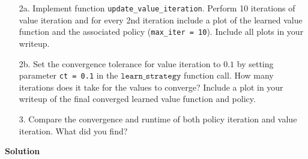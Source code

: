 \documentclass[submit]{harvardml}
\begin{document}
\begin{framed}
\begin{itemize}
    \item [2a.] Implement function
      \texttt{update\_value\_iteration}. Perform 10 iterations of
      value iteration and for every 2nd iteration include a plot of
      the learned value function and the associated policy
      (\texttt{max\_iter = 10}).  Include all plots in your writeup. 

    \item [2b.] Set the convergence tolerance for value iteration to
      $0.1$ by setting parameter \texttt{ct = 0.1} in the
      $\texttt{learn\_strategy}$ function call.  How many iterations
      does it take for the values to converge? Include a plot in your writeup of the final converged learned value function and policy.

      
\item[3.]  Compare the convergence and runtime of both policy iteration and value iteration.  What did you find?
\end{itemize}
\end{framed}
\textbf{Solution}





\newpage
\end{document}
